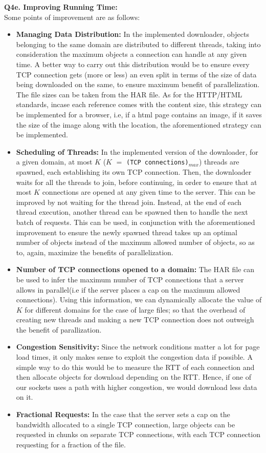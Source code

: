 \documentclass[12pt]{article}
\begin{document}

{\bfseries Q4e. Improving Running Time: }
\\ Some points of improvement are as follows:
\begin{itemize}
\item \textbf{Managing Data Distribution:} In the implemented downloader, objects belonging to the same domain are distributed to different threads, taking into consideration the maximum objects a connection can handle at any given time. A better way to carry out this distribution would be to ensure every TCP connection gets (more or less) an even split in terms of the size of data being downloaded on the same, to ensure maximum benefit of parallelization. The file sizes can be taken from the HAR file. As for the HTTP/HTML standards, incase each reference comes with the content size, this strategy can be implemented for a browser, i.e, if a html page contains an image, if it saves the size of the image along with the location, the aforementioned strategy can be implemented.
\item \textbf{Scheduling of Threads:} In the implemented version of the downloader, for a given domain, at most $K$ ($K$ $=$ \texttt{(TCP connections)$_{max}$}) threads are spawned, each establishing its own TCP connection. Then, the downloader waits for all the threads to join, before continuing, in order to ensure that at most $K$ connections are opened at any given time to the server. This can be improved by not waiting for the thread join. Instead, at the end of each thread execution, another thread can be spawned then to handle the next batch of requests. This can be used, in conjunction with the aforementioned improvement to ensure the newly spawned thread takes up an optimal number of objects instead of the maximum allowed number of objects, so as to, again, maximize the benefits of parallelization.  
\item \textbf{Number of TCP connections opened to a domain:} The HAR file can be used to infer the maximum number of TCP connections that a server allows in parallel(i.e if the server places a cap on the maximum allowed connections). Using this information, we can dynamically allocate the value of $K$ for different domains for the case of large files; so that the overhead of creating new threads and making a new TCP connection does not outweigh the benefit of parallization. 
\item \textbf{Congestion Sensitivity:} Since the network conditions matter a lot for page load times, it only makes sense to exploit the congestion data if possible. A simple way to do this would be to measure the RTT of each connection and then allocate objects for download depending on the RTT. Hence, if one of our sockets uses a path with higher congestion, we would download less data on it.
\item \textbf{Fractional Requests:} In the case that the server sets a cap on the bandwidth allocated to a single TCP connection, large objects can be requested in chunks on separate TCP connections, with each TCP connection requesting for a fraction of the file.
\end{itemize}
\end{document}
